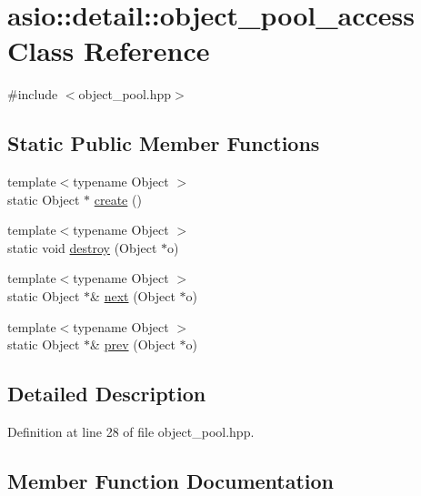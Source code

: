\hypertarget{classasio_1_1detail_1_1object__pool__access}{}\section{asio\+:\+:detail\+:\+:object\+\_\+pool\+\_\+access Class Reference}
\label{classasio_1_1detail_1_1object__pool__access}


{\ttfamily \#include $<$object\+\_\+pool.\+hpp$>$}

\subsection*{Static Public Member Functions}
\begin{DoxyCompactItemize}
\item 
{\footnotesize template$<$typename Object $>$ }\\static Object $\ast$ \hyperlink{classasio_1_1detail_1_1object__pool__access_ad1d1989e1c7e0036b62da0635cadfd8d}{create} ()
\item 
{\footnotesize template$<$typename Object $>$ }\\static void \hyperlink{classasio_1_1detail_1_1object__pool__access_a0d6cec37ef7694040c02b9c8b4fcd651}{destroy} (Object $\ast$o)
\item 
{\footnotesize template$<$typename Object $>$ }\\static Object $\ast$\& \hyperlink{classasio_1_1detail_1_1object__pool__access_a5805168e236c3d846733dccc31f7144d}{next} (Object $\ast$o)
\item 
{\footnotesize template$<$typename Object $>$ }\\static Object $\ast$\& \hyperlink{classasio_1_1detail_1_1object__pool__access_af4a976ede03d63540d9dadfd4c9f9501}{prev} (Object $\ast$o)
\end{DoxyCompactItemize}


\subsection{Detailed Description}


Definition at line 28 of file object\+\_\+pool.\+hpp.



\subsection{Member Function Documentation}
\hypertarget{classasio_1_1detail_1_1object__pool__access_ad1d1989e1c7e0036b62da0635cadfd8d}{}
